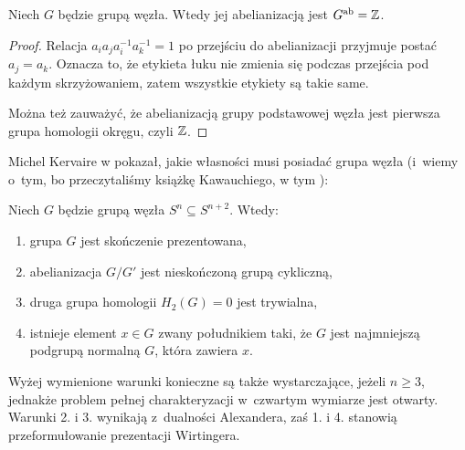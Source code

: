 \begin{corollary}
    Niech $G$ będzie grupą węzła.
    Wtedy jej abelianizacją jest $G^{\operatorname{ab}} = \mathbb Z$.
\end{corollary}

\begin{proof}
    Relacja $a_ia_ja_i^{-1}a_k^{-1}=1$ po przejściu do abelianizacji przyjmuje postać $a_j = a_k$.
    Oznacza to, że etykieta łuku nie zmienia się podczas przejścia pod każdym skrzyżowaniem, zatem wszystkie etykiety są takie same.

    Można też zauważyć, że abelianizacją grupy podstawowej węzła jest pierwsza grupa homologii okręgu, czyli $\mathbb Z$.
\end{proof}

Michel Kervaire w \cite{kervaire65} pokazał, jakie własności musi posiadać grupa węzła (i~wiemy o~tym, bo przeczytaliśmy książkę Kawauchiego, w tym \cite[tw. 14.1.1]{kawauchi96}):
%

\begin{proposition}
    Niech $G$ będzie grupą węzła $S^n \subseteq S^{n+2}$.
    Wtedy:
    \begin{enumerate}[leftmargin=*]
        \itemsep0em
        \item grupa $G$ jest skończenie prezentowana,
        \item abelianizacja $G/G'$ jest nieskończoną grupą cykliczną,
        \item druga grupa homologii $H_2(G) = 0$ jest trywialna,
        \item istnieje element $x \in G$ zwany południkiem taki, że $G$ jest najmniejszą podgrupą normalną $G$, która zawiera $x$.
    \end{enumerate}
\end{proposition}

Wyżej wymienione warunki konieczne są także wystarczające, jeżeli $n \ge 3$, jednakże problem pełnej charakteryzacji w~czwartym wymiarze jest otwarty.
Warunki 2. i 3. wynikają z~dualności Alexandera, zaś 1. i 4. stanowią przeformułowanie prezentacji Wirtingera.



